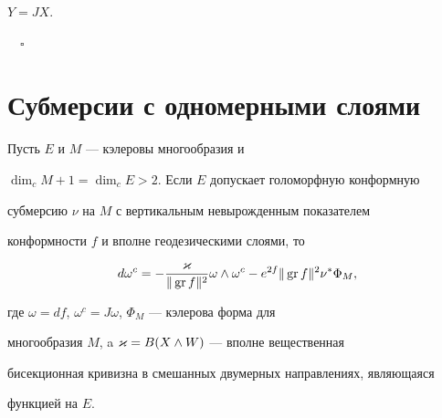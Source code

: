 $Y=JX$.


$\quad\square$





\section{Субмерсии с одномерными слоями}





\begin{lems}\label{lm4.1}


Пусть $E$ и $M$ --- кэлеровы многообразия и


$\dim_cM+1=\dim_cE>2$. Если $E$ допускает голоморфную конформную


субмерсию $\nu$ на $M$ с вертикальным невырожденным показателем


конформности $f$ и вполне геодезическими слоями, то


$$


d\omega^c=-\frac{\vkap}{\Vert \GR f\Vert^2}\omega \land \omega^c-


e^{2f}\Vert \GR f\Vert^2\nu^*\Phi_M,


$$


где $\omega =df$, $\omega^c=J\omega $, $\Phi_M$ --- кэлерова форма для


многообразия $M$, a $\varkappa =B(X\land W)$ --- вполне вещественная


бисекционная кривизна в смешанных двумерных направлениях, являющаяся


функцией на $E$.


\end{lems}





